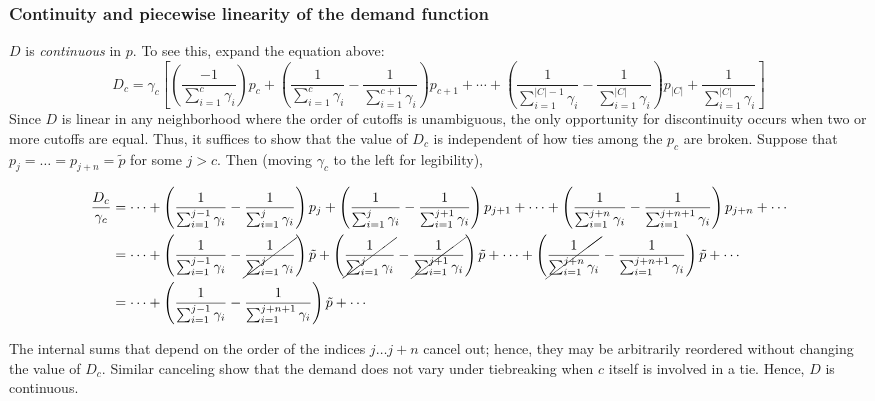 \documentclass[12pt]{article}
\theoremstyle{definition}
\begin{document}
\subsubsection{Continuity and piecewise linearity of the demand function}
$D$ is \emph{continuous} in $p$. To see this, expand the equation above:
\scriptsize\[D_c = \gamma_c \left[ \left(\frac{-1}{\sum_{i=1}^c \gamma_i}\right) p_c
+ \left(\frac{1}{\sum_{i=1}^{c} \gamma_i} - \frac{1}{\sum_{i=1}^{c+1} \gamma_i} \right) p_{c+1}
+ \cdots
+ \left(\frac{1}{\sum_{i=1}^{|C|-1} \gamma_i} - \frac{1}{\sum_{i=1}^{|C|} \gamma_i}\right) p_{|C|}
+ \frac{1}{\sum_{i=1}^{|C|} \gamma_i}
\right]\]
\normalsize Since $D$ is linear in any neighborhood where the order of cutoffs is unambiguous, the only opportunity for discontinuity occurs when two or more cutoffs are equal. Thus, it suffices to show that the value of $D_c$ is independent of how ties among the $p_c$ are broken. Suppose that $p_j = \dots = p_{j+n} = \tilde p$ for some $j > c$. Then (moving $\gamma_c$ to the left for legibility),

\scriptsize \begin{align}
\frac{D_c}{\gamma_c} &= \cdots
+ \left(\frac{1}{\sum_{i=1}^{j-1} \gamma_i} - \frac{1}{\sum_{i=1}^{j} \gamma_i} \right) p_{j}
+ \left(\frac{1}{\sum_{i=1}^{j} \gamma_i} - \frac{1}{\sum_{i=1}^{j+1} \gamma_i} \right) p_{j+1}
+ \cdots
+ \left(\frac{1}{\sum_{i=1}^{j+n} \gamma_i} - \frac{1}{\sum_{i=1}^{j+n+1} \gamma_i}\right) p_{j+n}
+ \cdots \\
&= \cdots
+ \left(\frac{1}{\sum_{i=1}^{j-1} \gamma_i} - \cancel{\frac{1}{\sum_{i=1}^{j} \gamma_i}} \right) \tilde p
+ \left(\cancel{\frac{1}{\sum_{i=1}^{j} \gamma_i}} - \cancel{\frac{1}{\sum_{i=1}^{j+1} \gamma_i}} \right) \tilde p
+ \cdots
+ \left(\cancel{\frac{1}{\sum_{i=1}^{j+n} \gamma_i}} - \frac{1}{\sum_{i=1}^{j+n+1} \gamma_i}\right) \tilde p
+ \cdots \\
&= \cdots
+ \left(\frac{1}{\sum_{i=1}^{j-1} \gamma_i} - \frac{1}{\sum_{i=1}^{j+n+1} \gamma_i}\right) \tilde p
+ \cdots
\end{align}

\normalsize The internal sums that depend on the order of the indices $j \dots j+n$ cancel out; hence, they may be arbitrarily reordered without changing the value of $D_c$. Similar canceling show that the demand does not vary under tiebreaking when $c$ itself is involved in a tie. Hence, $D$ is continuous. 
\end{document}
